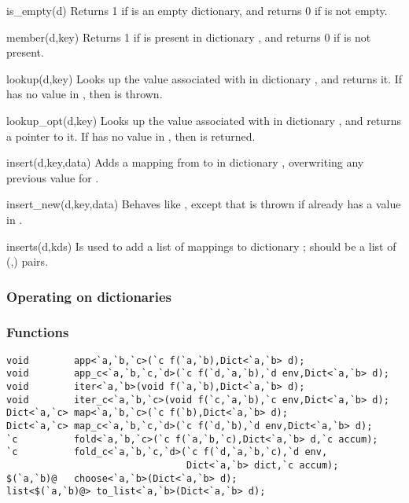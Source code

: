 \begin{defun}{is_empty}{(d)}
Returns 1 if  is an empty dictionary, and returns 0 if  is
not empty.
\end{defun}

\begin{defun}{member}{(d,key)}
Returns 1 if  is present in dictionary , and returns 0
if  is not present.
\end{defun}

\begin{defun}{lookup}{(d,key)}
Looks up the value associated with  in dictionary , and
returns it.  If  has no value in , then  is
thrown.
\end{defun}

\begin{defun}{lookup_opt}{(d,key)}
Looks up the value associated with  in dictionary , and
returns a pointer to it.  If  has no value in , then
 is returned.
\end{defun}

\begin{defun}{insert}{(d,key,data)}
Adds a mapping from  to  in dictionary ,
overwriting any previous value for .
\end{defun}

\begin{defun}{insert_new}{(d,key,data)}
Behaves like , except that  is thrown if
 already has a value in .
\end{defun}

\begin{defun}{inserts}{(d,kds)}
Is used to add a list of mappings to dictionary ; 
should be a list of (,) pairs.
\end{defun}

\subsubsection*{Operating on dictionaries}

\subsubsection*{Functions}
\begin{verbatim}
void        app<`a,`b,`c>(`c f(`a,`b),Dict<`a,`b> d);
void        app_c<`a,`b,`c,`d>(`c f(`d,`a,`b),`d env,Dict<`a,`b> d);
void        iter<`a,`b>(void f(`a,`b),Dict<`a,`b> d);
void        iter_c<`a,`b,`c>(void f(`c,`a,`b),`c env,Dict<`a,`b> d);
Dict<`a,`c> map<`a,`b,`c>(`c f(`b),Dict<`a,`b> d);
Dict<`a,`c> map_c<`a,`b,`c,`d>(`c f(`d,`b),`d env,Dict<`a,`b> d);
`c          fold<`a,`b,`c>(`c f(`a,`b,`c),Dict<`a,`b> d,`c accum);
`c          fold_c<`a,`b,`c,`d>(`c f(`d,`a,`b,`c),`d env,
                                Dict<`a,`b> dict,`c accum);
$(`a,`b)@   choose<`a,`b>(Dict<`a,`b> d);
list<$(`a,`b)@> to_list<`a,`b>(Dict<`a,`b> d);
\end{verbatim}

